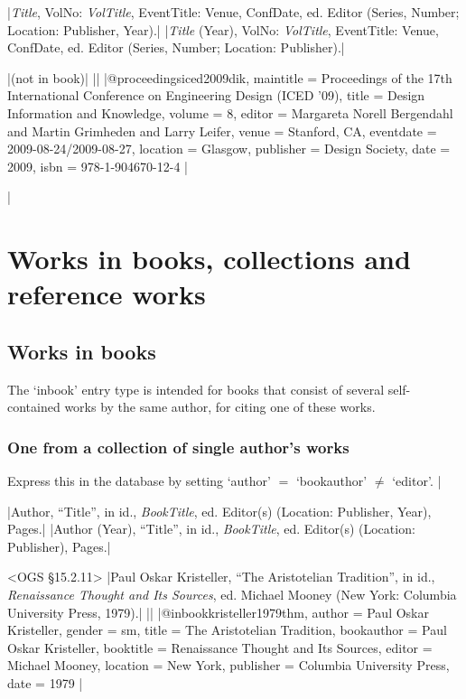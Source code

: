 \documentclass[extrafontsizes,11pt,a4paper,oneside]{memoir}
\newcommand*{\lit}[1]{\textsf{#1}}
\newcommand*{\code}[1]{`\textsf{#1}'}
\begin{document}
\specs
|\emph{Title}, VolNo: \emph{VolTitle}, EventTitle: Venue, ConfDate, \lit{ed.} Editor (Series, Number; Location: Publisher, Year).|%
|\emph{Title} (Year), VolNo: \emph{VolTitle}, EventTitle: Venue, ConfDate, \lit{ed.} Editor (Series, Number; Location: Publisher).|

\bibexample
|(not in book)|%
||%
|@proceedings{iced2009dik,
  maintitle = {Proceedings of the 17th International Conference on Engineering Design (ICED ’09)},
  title = {Design Information and Knowledge},
  volume = {8},
  editor = {Margareta Norell Bergendahl and Martin Grimheden and Larry Leifer},
  venue = {Stanford, CA},
  eventdate = {2009-08-24/2009-08-27},
  location = {Glasgow},
  publisher = {Design Society},
  date = {2009},
  isbn = {978-1-904670-12-4}
}|

\todoc|
\chapter{Works in books, collections and reference works}\label{sec:inx}

\section{Works in books}

The \code{inbook} entry type is intended for books that consist of several self-contained works by the same author, for citing one of these works. 

\subsection{One from a collection of single author's works}

Express this in the database by setting \code{author} $=$ \code{bookauthor} $\neq$ \code{editor}.
|

\specs
|Author, \enquote{Title}, \lit{in id.}, \emph{BookTitle}, \lit{ed.} Editor(s) (Location: Publisher, Year), Pages.|%
|Author (Year), \enquote{Title}, \lit{in id.}, \emph{BookTitle}, \lit{ed.} Editor(s) (Location: Publisher), Pages.|

\bibexample<OGS \S15.2.11>
|Paul Oskar Kristeller, \enquote{The Aristotelian Tradition}, in id., \emph{Renaissance Thought and Its Sources}, ed. Michael Mooney (New York: Columbia University Press, 1979).|%
||%
|@inbook{kristeller1979thm,
  author = {Paul Oskar Kristeller},
  gender = {sm},
  title = {The Aristotelian Tradition},
  bookauthor = {Paul Oskar Kristeller},
  booktitle = {Renaissance Thought and Its Sources},
  editor = {Michael Mooney},
  location = {New York},
  publisher = {Columbia University Press},
  date = {1979}
}|
\end{document}
